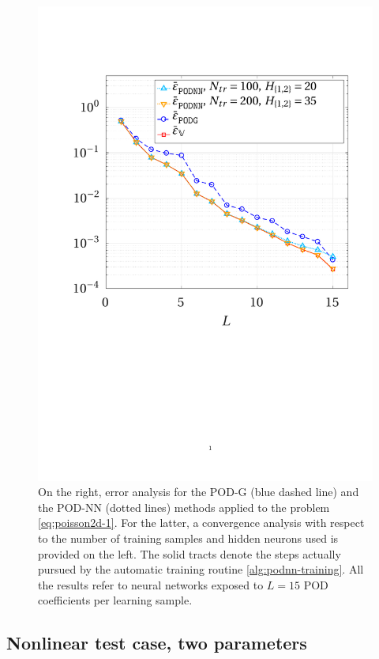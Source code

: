 \documentclass[12pt, a4paper, twoside, openright]{report}
\numberwithin{equation}{chapter}
\theoremstyle{theorem}
\theoremstyle{definition}
\theoremstyle{remark}
\theoremstyle{proposition}
\numberwithin{figure}{chapter}
\begin{document}
\begin{figure}[H]
			\includegraphics[scale = 0.43, trim = {1.5cm 9cm 1.5cm 3.5cm}, clip]{poisson2d_1_error_vs_rank}
			
			\caption{On the right, error analysis for the POD-G (blue dashed line) and the POD-NN (dotted lines) methods applied to the problem \eqref{eq:poisson2d-1}. For the latter, a convergence analysis with respect to the number of training samples and hidden neurons used is provided on the left. The solid tracts denote the steps actually pursued by the automatic training routine \ref{alg:podnn-training}. All the results refer to neural networks exposed to $L = 15$ POD coefficients per learning sample.}
			\label{fig:poisson2d-1-fig2}
		\end{figure}
		
	\subsection{Nonlinear test case, two parameters}
	\label{section:poisson2d-2}
	
\end{document}
